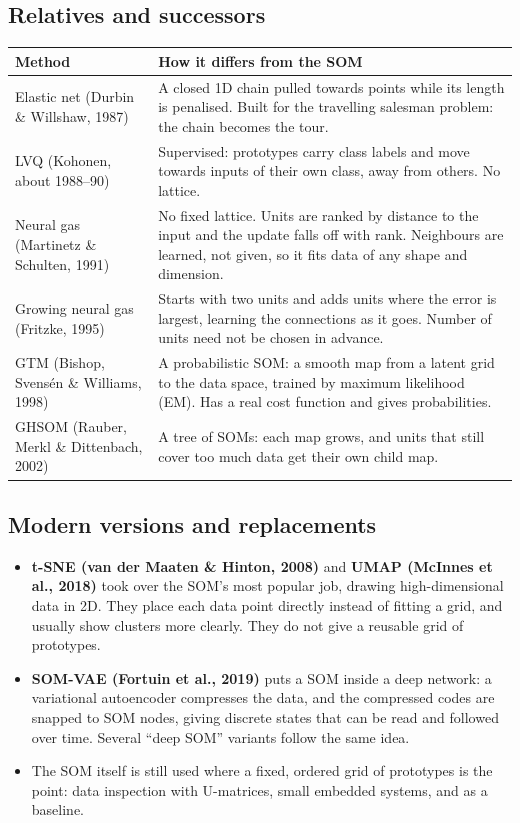 \documentclass[11pt,a4paper]{article}
\begin{document}
\subsection{Relatives and successors}
\begin{center}\small
\begin{tabular}{@{}p{3.6cm}p{11cm}@{}}
\toprule
Method & How it differs from the SOM\\
\midrule
Elastic net (Durbin \& Willshaw, 1987) & A closed 1D chain pulled towards points while its length is penalised. Built
for the travelling salesman problem: the chain becomes the tour.\\
LVQ (Kohonen, about 1988--90) & Supervised: prototypes carry class labels and move towards inputs of their own class,
away from others. No lattice.\\
Neural gas (Martinetz \& Schulten, 1991) & No fixed lattice. Units are ranked by distance to the input and the update
falls off with rank. Neighbours are learned, not given, so it fits data of any shape and dimension.\\
Growing neural gas (Fritzke, 1995) & Starts with two units and adds units where the error is largest, learning the
connections as it goes. Number of units need not be chosen in advance.\\
GTM (Bishop, Svensén \& Williams, 1998) & A probabilistic SOM: a smooth map from a latent grid to the data space,
trained by maximum likelihood (EM). Has a real cost function and gives probabilities.\\
GHSOM (Rauber, Merkl \& Dittenbach, 2002) & A tree of SOMs: each map grows, and units that still cover too much data
get their own child map.\\
\bottomrule
\end{tabular}
\end{center}

\subsection{Modern versions and replacements}
\begin{itemize}[leftmargin=*]
\item \textbf{t-SNE (van der Maaten \& Hinton, 2008)} and \textbf{UMAP (McInnes et al., 2018)} took over the SOM's
most popular job, drawing high-dimensional data in 2D. They place each data point directly instead of fitting a grid,
and usually show clusters more clearly. They do not give a reusable grid of prototypes.
\item \textbf{SOM-VAE (Fortuin et al., 2019)} puts a SOM inside a deep network: a variational autoencoder compresses
the data, and the compressed codes are snapped to SOM nodes, giving discrete states that can be read and followed
over time. Several ``deep SOM'' variants follow the same idea.
\item The SOM itself is still used where a fixed, ordered grid of prototypes is the point: data inspection with
U-matrices, small embedded systems, and as a baseline.
\end{itemize}
\end{document}

